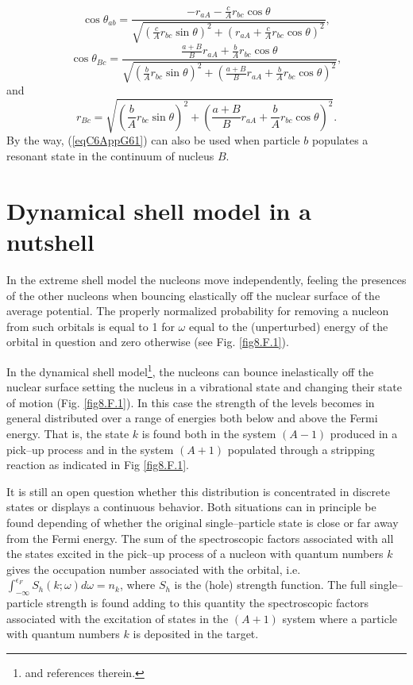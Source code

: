 \begin{subappendices}
\begin{equation}\label{eqC6AppG63}
\cos \theta_{ab}=\frac{-r_{aA}-\frac{c}{A}r_{bc}\cos \theta}{\sqrt{\left(\frac{c}{A}r_{bc}\sin \theta\right)^2+\left(r_{aA}+\frac{c}{A}r_{bc}\cos \theta\right)^2}},
\end{equation}
\begin{equation}\label{eqC6AppG64}
\cos \theta_{Bc}=\frac{\frac{a+B}{B}r_{aA}+\frac{b}{A}r_{bc}\cos \theta}{\sqrt{\left(\frac{b}{A}r_{bc}\sin \theta\right)^2+\left(\frac{a+B}{B}r_{aA}+\frac{b}{A}r_{bc}\cos \theta\right)^2}},
\end{equation}
and
\begin{equation}\label{eqC6AppG65}
r_{Bc}=\sqrt{\left(\frac{b}{A}r_{bc}\sin \theta\right)^2+\left(\frac{a+B}{B}r_{aA}+\frac{b}{A}r_{bc}\cos \theta\right)^2}.
\end{equation}
By the way, (\ref{eqC6AppG61}) can also be used when particle $b$ populates a resonant state in the continuum of nucleus $B$.  

\section{Dynamical shell model in a nutshell}\label{C6AppI}
In the extreme shell model the nucleons move independently, feeling the presences of the other nucleons when bouncing elastically off the nuclear surface of the average potential. The properly normalized probability for removing a nucleon from such orbitals is equal to 1 for $\omega$ equal to the (unperturbed) energy of the orbital in question and zero otherwise (see Fig. \ref{fig8.F.1}).

In the dynamical shell model\footnote{\cite{Mahaux:85} and references therein.}, the nucleons can bounce inelastically off the nuclear surface setting the nucleus in a vibrational state and changing their state of motion (Fig. \ref{fig8.F.1}). In this case the strength of the levels becomes in general distributed over a range of energies both below and above the Fermi energy. That is, the state $k$ is found both in the system $(A-1)$ produced in a pick--up process and in the system $(A+1)$ populated through a stripping reaction as indicated in Fig \ref{fig8.F.1}.



It is still an open question whether this distribution is concentrated in discrete states or displays a continuous behavior. Both situations can in principle be found depending of whether the original single--particle state is close or far away from the Fermi energy. The sum of the spectroscopic factors associated with all the states excited in the pick--up process of a nucleon with quantum numbers $k$ gives the occupation number associated with the orbital, i.e. $\int_{-\infty}^{\epsilon_F}S_{h}(k;\omega)d\omega=n_k$, where $S_h$ is the (hole) strength function. The full single--particle strength is found adding to this quantity the spectroscopic factors associated with the excitation of states in the $(A+1)$ system where a particle with quantum numbers $k$ is deposited in the target.




\end{subappendices}
